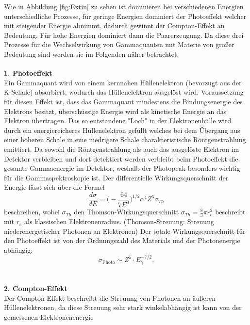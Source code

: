 Wie in Abbildung \ref{fig:Extin} zu sehen ist dominieren bei verschiedenen Energien
unterschiedliche Prozesse, für geringe Energien dominiert der Photoeffekt welcher mit
steigender Energie abnimmt, dadurch gewinnt der Compton-Effekt an Bedeutung. Für hohe
Energien dominiert dann die Paarerzeugung.
Da diese drei Prozesse für die Wechselwirkung von Gammaquanten mit Materie von großer Bedeutung sind
werden sie im Folgenden näher betrachtet.
\cite{Springer3}
\\
\\
\textbf{1. Photoeffekt}\\
Ein Gammaquant wird von einem kernnahen Hüllenelektron (bevorzugt aus der K-Schale) absorbiert,
wodurch das Hüllenelektron ausgelöst wird. Voraussetzung für diesen Effekt ist, dass das Gammaquant
mindestens die Bindungsenergie des Elektrons besitzt, überschüssige Energie wird als kinetische
Energie an das Elektron übertragen.
Das so entstandene "Loch" in der Elektronenhülle wird durch ein energiereicheres Hüllenelektron
gefüllt welches bei dem Übergang aus einer höheren Schale in eine niedrigere Schale
charakteristische Röntgenstrahlung emittiert.
Da sowohl die Röntgenstrahlung als auch das ausgelöste Elektron im Detektor verbleiben und
dort detektiert werden verbleibt beim Photoeffekt die gesamte Gammaenergie im Detektor, weshalb
der Photopeak besonders wichtig für die Gammaspektroskopie ist.
Der differentielle Wirkungsquerschnitt der Energie lässt sich über die Formel
\begin{equation}
  \frac{d \sigma}{d E} = \bigg(-\frac{64}{7E^{9}}\bigg)^{1/2}\alpha^4 Z^5\sigma_{Th}
  \label{eqn:diffPhoto}
\end{equation}
beschreiben, wobei $\sigma_{Th}$ den Thomson-Wirkungsquerschnitt $\sigma_{Th} = \frac{8}{3}\pi r_{e}^2$
beschreibt mit $r_e$ als klassischen Elektronenradius.
(Thomson-Streuung: Streuung niederenergetischer Photonen an Elektronen) \cite{Springer3}
Der totale Wirkungsquerschnitt für den Photoeffekt ist von der Ordnungszahl des Materials
und der Photonenergie abhängig:
\begin{equation}
  \sigma_{\text{Photo}}\sim Z^5\cdot E_{\gamma}^{-7/2}.
  \label{eqn:WQphoto}
\end{equation}
\cite{Karlsruhe}
\\
\\
\textbf{2. Compton-Effekt}\\
Der Compton-Effekt beschreibt die Streuung von Photonen an äußeren Hüllenelektronen, da
diese Streuung sehr stark winkelabhängig ist kann von der gemessenen Elektronenenergie
